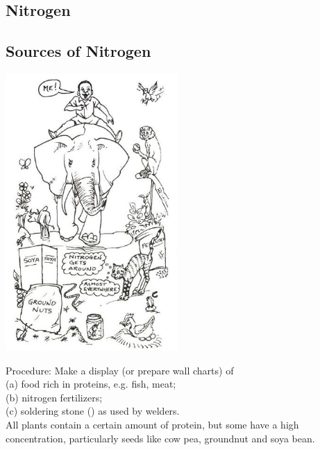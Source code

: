 \begin{multicols}{2}

\section*{Nitrogen} 


\subsection{Sources of Nitrogen}

\begin{center}
\includegraphics[width=0.49\textwidth]{./img/source/nitrogen-sources.jpg}
\end{center}

\begin{description*}
\item[Procedure:]{Make a display (or prepare wall
charts) of\\
(a) food rich in proteins, e.g. fish, meat;\\
(b) nitrogen fertilizers;\\
(c) soldering stone () as used by welders.\\
All plants contain a certain amount of protein,
but some have a high concentration, particularly
seeds like cow pea, groundnut and soya bean.}
\end{description*}


\end{multicols}

